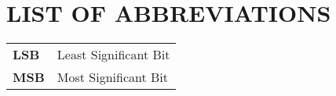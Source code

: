 

\chapter{LIST OF ABBREVIATIONS}
\noindent


\begin{longtable}[l]{p{55pt}p{300pt}}
\textbf{LSB}		&	Least Significant Bit\\
\textbf{MSB}		&	Most Significant Bit\\
\end{longtable}

